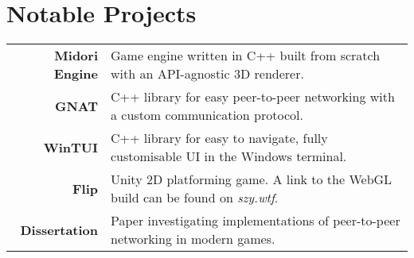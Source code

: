 \section*{Notable Projects}
\begin{center}
    \vspace*{-5mm}
    \begin{tabular}{ r p{} }
      \color{sjBlue}\textbf{Midori Engine} & Game engine written in C++ built from scratch with an API-agnostic 3D renderer. \\
      \color{sjBlue}\textbf{GNAT}          & C++ library for easy peer-to-peer networking with a custom communication protocol. \\
      \color{sjBlue}\textbf{WinTUI}        & C++ library for easy to navigate, fully customisable UI in the Windows terminal. \\
      \color{sjBlue}\textbf{Flip}          & Unity 2D platforming game. A link to the WebGL build can be found on \textit{szy.wtf}.  \\
      \color{sjBlue}\textbf{Dissertation}  & Paper investigating implementations of peer-to-peer networking in modern games.  \\
    \end{tabular}

\end{center}
